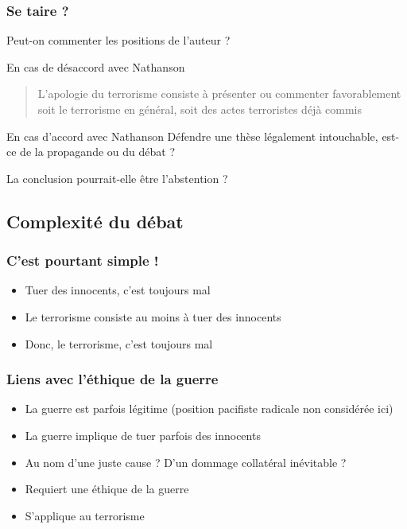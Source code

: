 \documentclass[english, french]{beamer}
\begin{document}
\begin{frame}
  \frametitle{Se taire ?}
  Peut-on commenter les positions de l’auteur ?
  \begin{block}{En cas de désaccord avec Nathanson}
    \begin{quote}
      L'apologie du terrorisme consiste à présenter ou commenter favorablement soit le terrorisme en général, soit des actes terroristes déjà commis
    \end{quote}
    \vspace{-3mm}
    \small
  \end{block}
  \begin{block}{En cas d’accord avec Nathanson}
    Défendre une thèse légalement intouchable, est-ce de la propagande ou du débat ?
  \end{block}
  La conclusion pourrait-elle être l’abstention ?
\end{frame}

\subsection{Complexité du débat}
\begin{frame}
  \frametitle{C’est pourtant simple !}
  \begin{itemize}
    \item Tuer des innocents, c’est toujours mal
    \item Le terrorisme consiste au moins à tuer des innocents
    \item Donc, le terrorisme, c’est toujours mal
  \end{itemize}
\end{frame}

\begin{frame}
  \frametitle{Liens avec l’éthique de la guerre}
  \begin{itemize}
    \item La guerre est parfois légitime (position pacifiste radicale non considérée ici)
    \item La guerre implique de tuer parfois des innocents
    \item Au nom d’une juste cause ? D’un dommage collatéral inévitable ?
    \item Requiert une éthique de la guerre
    \item S’applique au terrorisme
  \end{itemize}
\end{frame}
\end{document}
